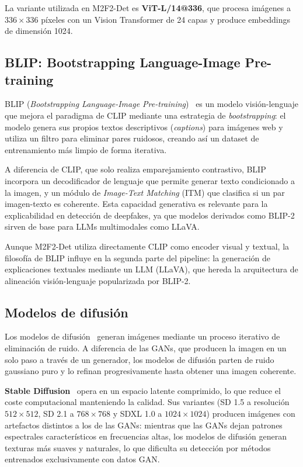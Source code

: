 \documentclass[pdflatex,sn-mathphys-num]{sn-jnl}
\begin{document}
La variante utilizada en M2F2-Det es \textbf{ViT-L/14@336}, que procesa imágenes a $336\times336$ píxeles con un Vision Transformer de 24 capas y produce embeddings de dimensión 1024.

\subsection{BLIP: Bootstrapping Language-Image Pre-training}\label{subsec:blip}

BLIP (\emph{Bootstrapping Language-Image Pre-training})~\cite{li2022blip} es un modelo visión-lenguaje que mejora el paradigma de CLIP mediante una estrategia de \emph{bootstrapping}: el modelo genera sus propios textos descriptivos (\emph{captions}) para imágenes web y utiliza un filtro para eliminar pares ruidosos, creando así un dataset de entrenamiento más limpio de forma iterativa.

A diferencia de CLIP, que solo realiza emparejamiento contrastivo, BLIP incorpora un decodificador de lenguaje que permite generar texto condicionado a la imagen, y un módulo de \emph{Image-Text Matching} (ITM) que clasifica si un par imagen-texto es coherente. Esta capacidad generativa es relevante para la explicabilidad en detección de deepfakes, ya que modelos derivados como BLIP-2~\cite{li2023blip2} sirven de base para LLMs multimodales como LLaVA.

Aunque M2F2-Det utiliza directamente CLIP como encoder visual y textual, la filosofía de BLIP influye en la segunda parte del pipeline: la generación de explicaciones textuales mediante un LLM (LLaVA), que hereda la arquitectura de alineación visión-lenguaje popularizada por BLIP-2.

\subsection{Modelos de difusión}\label{subsec:diffusion}

Los modelos de difusión~\cite{rombach2022latentdiffusion, ho2020ddpm} generan imágenes mediante un proceso iterativo de eliminación de ruido. A diferencia de las GANs, que producen la imagen en un solo paso a través de un generador, los modelos de difusión parten de ruido gaussiano puro y lo refinan progresivamente hasta obtener una imagen coherente.

\textbf{Stable Diffusion}~\cite{rombach2022latentdiffusion} opera en un espacio latente comprimido, lo que reduce el coste computacional manteniendo la calidad. Sus variantes (SD 1.5 a resolución $512\times512$, SD 2.1 a $768\times768$ y SDXL 1.0 a $1024\times1024$) producen imágenes con artefactos distintos a los de las GANs: mientras que las GANs dejan patrones espectrales característicos en frecuencias altas, los modelos de difusión generan texturas más suaves y naturales, lo que dificulta su detección por métodos entrenados exclusivamente con datos GAN.
\end{document}
